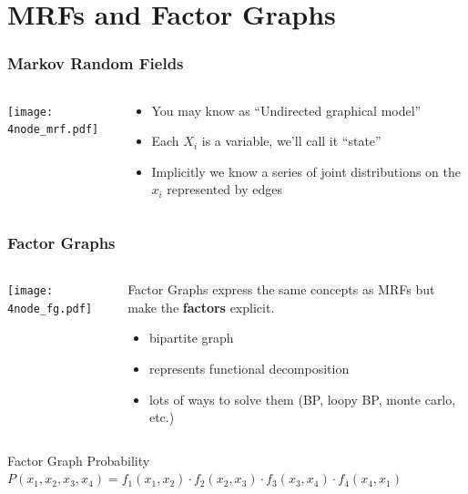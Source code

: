 \documentclass[compress]{beamer}
\begin{document}
\section{MRFs and Factor Graphs}
\frame{\tableofcontents[currentsection]}
\begin{frame}
  \frametitle{Markov Random Fields}
  \begin{columns}
    \begin{column}{5cm}
      \texttt{[image: 4node\_mrf.pdf]}
    \end{column}
    \begin{column}{5cm}
      \begin{itemize}
        \item You may know as ``Undirected graphical model'' 
        \item Each $X_i$ is a variable, we'll call it ``state'' 
          \item Implicitly we know a series of joint distributions on the $x_i$ represented by edges
        \end{itemize}
    \end{column}
  \end{columns}
\end{frame}

\begin{frame}
  \frametitle{Factor Graphs}
  \begin{columns}
    \begin{column}{5cm}
      \texttt{[image: 4node\_fg.pdf]}
    \end{column}
    \begin{column}{5cm}
      Factor Graphs \cite{kschischang_factor_2001} express the same concepts
      as MRFs but make the \textbf{factors} explicit. 
      \begin{itemize}
        \item bipartite graph
        \item represents functional decomposition
        \item lots of ways to solve them (BP, loopy BP, monte carlo, etc.)
        \end{itemize}
    \end{column}
  \end{columns}
  \begin{block}{Factor Graph Probability}
    $P(x_1, x_2, x_3, x_4) = f_1(x_1, x_2) \cdot f_2(x_2, x_3) \cdot f_3(x_3, x_4) \cdot f_4(x_4, x_1)$
  \end{block}
\end{frame}
\end{document}
